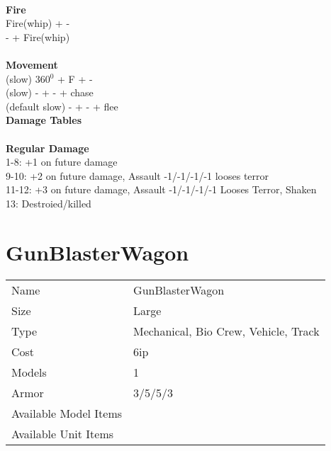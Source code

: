 \ \\ {\bf Fire } \\
Fire(whip) + - \\
- + Fire(whip) \\
\ \\ {\bf Movement } \\
(slow) 360$^0$ + F + - \\
(slow) - + - + chase \\
(default slow) - + - + flee \\



{\bf Damage Tables} \\
\ \\ {\bf Regular Damage } \\
1-8: +1 on future damage \\
9-10: +2 on future damage, Assault -1/-1/-1/-1 looses terror \\
11-12: +3 on future damage, Assault -1/-1/-1/-1 Looses Terror, Shaken \\
13: Destroied/killed \\









\pagebreak

\section{ GunBlasterWagon }

\begin{tabular}{ll}
  Name & GunBlasterWagon \\
  Size & Large\\
  Type & Mechanical, Bio Crew, Vehicle, Track\\
  Cost & 6ip\\
  Models & 1\\
  Armor & 3/5/5/3\\
  Available Model Items &  \\
  Available Unit Items &  \\
\end{tabular}

